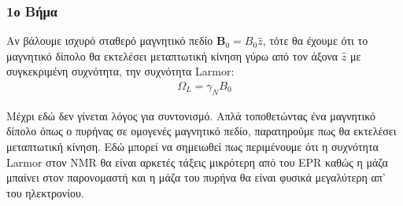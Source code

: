 \documentclass[a4paper]{article}
\begin{document}
	\subsubsection*{1ο Βήμα}
		Αν βάλουμε ισχυρό σταθερό μαγνητικό πεδίο $\textbf{B}_0=B_0\hat{z}$, τότε θα έχουμε ότι το μαγνητικό δίπολο θα εκτελέσει μεταπτωτική κίνηση γύρω από τον άξονα $\hat{z}$ με συγκεκριμένη συχνότητα, την συχνότητα Larmor: 
		\begin{align}\label{2}
			\Omega_L = \gamma_NB_0 
		\end{align}
		
Μέχρι εδώ δεν γίνεται λόγος για συντονισμό. Απλά τοποθετώντας ένα μαγνητικό δίπολο όπως ο πυρήνας σε ομογενές μαγνητικό πεδίο, παρατηρούμε πως θα εκτελέσει μεταπτωτική κίνηση. Εδώ μπορεί να σημειωθεί πως περιμένουμε ότι η συχνότητα Larmor στον NMR θα είναι αρκετές τάξεις μικρότερη από του EPR καθώς η μάζα μπαίνει στον παρονομαστή και η μάζα του πυρήνα θα είναι φυσικά μεγαλύτερη απ' του ηλεκτρονίου.
	
\end{document}
